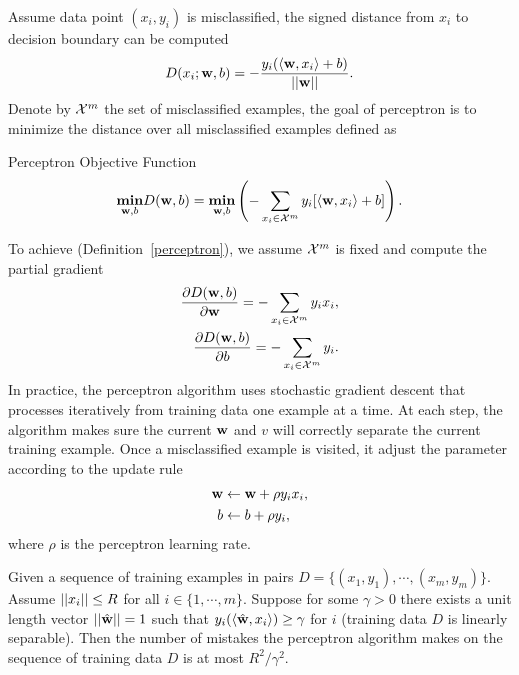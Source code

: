 Assume data point $(x_i,y_i)$ is misclassified, the signed distance from $x_i$ to decision boundary can be computed 
\begin{align*}
	D(x_i;\mathbf {w},b) = -\frac{y_i(\langle \mathbf {w}, x_i \rangle+b)}{\left|\left| \mathbf {w} \right|\right|}.
\end{align*}
Denote by $\mathcal{X}^m$ the set of misclassified examples, the goal of perceptron is to minimize the distance over all misclassified examples defined as
\begin{definition}{Perceptron Objective Function}\label{perceptron}
	\begin{align*}
		\underset{\mathbf {w},b}{\textbf{min}} D(\mathbf {w},b) = \underset{\mathbf {w},b}{\textbf{min}} \left( -\sum_{x_i\in\mathcal{X}^{m}}y_i[\langle \mathbf {w}, x_i \rangle+b]\right).
	\end{align*}
\end{definition}
To achieve (Definition~\ref{perceptron}), we assume $\mathcal{X}^{m}$ is fixed and compute the partial gradient
\begin{align*}
	\frac{\partial D(\mathbf {w},b)}{\partial\mathbf {w}} = -\sum_{x_i\in\mathcal{X}^m}{y_ix_i},\\
	\frac{\partial D(\mathbf {w},b)}{\partial b} = -\sum_{x_i\in\mathcal{X}^m}{y_i}.
\end{align*}
In practice, the perceptron algorithm uses stochastic gradient descent that processes iteratively from training data one example at a time.
At each step, the algorithm makes sure the current $\mathbf {w}$ and $v$ will correctly separate the current training example. 
Once a misclassified example is visited, it adjust the parameter according to the update rule
\begin{align*}
	\mathbf {w} &\leftarrow \mathbf {w} + \rho y_i x_i,\\
	b &\leftarrow b + \rho y_i,
\end{align*}
where $\rho$ is the perceptron learning rate.
\begin{theory}{\citep{Block62,Novikoff62}}\label{perceptron_theory}
	Given a sequence of training examples in pairs $D=\{(x_1,y_1),\cdots,(x_m,y_m)\}$. 
	Assume $\left|\left| x_i \right|\right|\le R$ for all $i\in\{1,\cdots,m\}$.
	Suppose for some $\gamma>0$ there exists a unit length vector $\left|\left| \hat{\mathbf {w}} \right|\right|=1$ such that $y_i(\langle \hat{\mathbf {w}}, x_i \rangle)\ge\gamma$ for $i$ (training data $D$ is linearly separable).
	Then the number of mistakes the perceptron algorithm makes on the sequence of training data $D$ is at most ${R^2}/{\gamma^2}$.
\end{theory}
